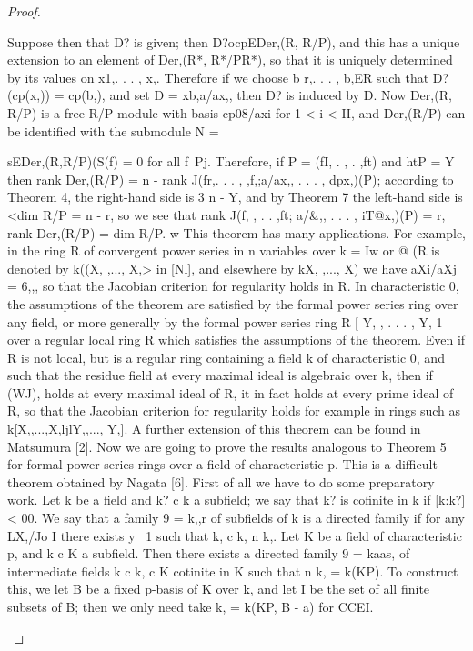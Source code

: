 \begin{proof}
\begin{mathematicalrecord}
Suppose then that D? is given; then D?ocpEDer,(R, R/P), and this has
a unique extension to an element of Der,(R*, R*/PR*),                             so that
it is uniquely determined by its values on x1,. . . , x,. Therefore if we choose
b r,. . . , b,ER such that D?(cp(x,)) = cp(b,), and set D = xb,a/ax,, then D? is
induced by D.
    Now Der,(R, R/P) is a free R/P-module with basis cp08/axi for 1 < i < II,
and Der,(R/P) can be identified with the submodule
              N = {sEDer,(R,R/P)(S(f)           = 0 for all f~Pj.
Therefore, if P = (fI, . , . ,ft) and htP = Y then
              rank Der,(R/P) = n - rank J(fr,. . . , ,f,;a/ax,, . . . , dpx,)(P);
according to Theorem 4, the right-hand side is 3 n - Y, and by Theorem 7
the left-hand side is <dim R/P = n - r, so we see that
              rank J(f, , . . ,ft; a/&,, . . . , iT@x,)(P) = r,
              rank Der,(R/P) = dim R/P. w
   This theorem has many applications. For example, in the ring R of
convergent power series in n variables over k = Iw or @ (R is denoted by
k((X, ,..., X,> in [Nl],              and elsewhere by k{X, ,..., X}) we have
aXi/aXj = 6,,, so that the Jacobian criterion for regularity holds in R. In
characteristic 0, the assumptions of the theorem are satisfied by the formal
power series ring over any field, or more generally by the formal power
series ring R [ Y, , . . . , Y, 1 over a regular local ring R which satisfies the
assumptions of the theorem. Even if R is not local, but is a regular ring
containing a field k of characteristic       0, and such that the residue field at
every maximal ideal is algebraic over k, then if (WJ), holds at every
maximal ideal of R, it in fact holds at every prime ideal of R, so that the
Jacobian criterion for regularity holds for example in rings such as
k[X,,...,X,ljlY,,...,         Y,]. A further extension of this theorem can be
found in Matsumura           [2].
    Now we are going to prove the results analogous to Theorem 5 for formal
power series rings over a field of characteristic p. This is a difficult theorem
obtained by Nagata [6]. First of all we have to do some preparatory work.
    Let k be a field and k? c k a subfield; we say that k? is cofinite in k if
[k:k?] < 00. We say that a family 9 = {k},,r             of subfields of k is a
directed family if for any LX,/Jo I there exists y ~1 such that k, c k, n k,.
    Let K be a field of characteristic      p, and k c K a subfield. Then there
exists a directed family 9 = {ka}as, of intermediate fields k c k, c K
cotinite in K such that n k, = k(KP). To construct this, we let B be a fixed
p-basis of K over k, and let I be the set of all finite subsets of B; then we
only need take k, = k(KP, B - a) for CCEI.

}
\end{mathematicalrecord}
\end{proof}
